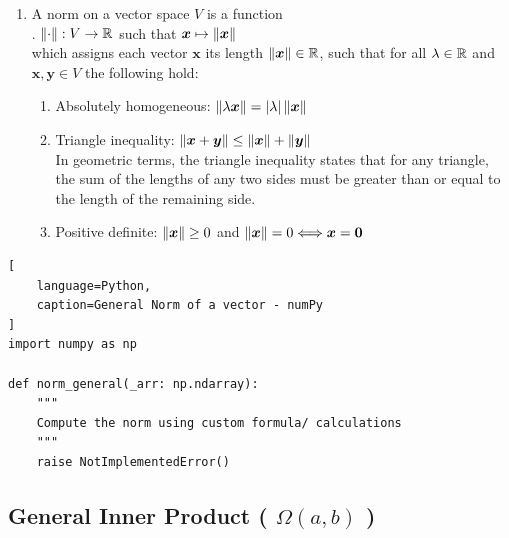 \begin{enumerate}
    \item 
    \begin{definition}[Norm]
        A norm on a vector space $V$ is a function
        \hfill \cite{mfml/book/mml/Deisenroth-Faisal-Ong}
        \\
        .\hfill
        $\left\| \cdot \right\|: V \to \mathbb{R}$ such that $\bm{x} \mapsto \left\| \bm{x} \right\|$
        \hfill \cite{mfml/book/mml/Deisenroth-Faisal-Ong}
        \\
        which assigns each vector $\bm{x}$ its length $\left\| \bm{x} \right\| \in \mathbb{R}$, such that for all $\lambda \in \mathbb{R}$ and $\bm{x}, \bm{y} \in V$ the following hold:
        \hfill \cite{mfml/book/mml/Deisenroth-Faisal-Ong}
    \end{definition}
    \begin{enumerate}
        \item Absolutely homogeneous: $\left\| \lambda \bm{x} \right\| = \left| \lambda \right| \left\| \bm{x} \right\|$
        \hfill \cite{mfml/book/mml/Deisenroth-Faisal-Ong}

        \item Triangle inequality: $\left\| \bm{x} + \bm{y} \right\| \leq \left\| \bm{x} \right\| + \left\| \bm{y} \right\|$
        \hfill \cite{mfml/book/mml/Deisenroth-Faisal-Ong}
        \\
        In geometric terms, the triangle inequality states that for any triangle, the sum of the lengths of any two sides must be greater than or equal to the length of the remaining side.
        \hfill \cite{mfml/book/mml/Deisenroth-Faisal-Ong}

        \item Positive definite: $\left\| \bm{x} \right\| \geq 0$ and $\left\| \bm{x} \right\| = 0 \Longleftrightarrow \bm{x} = \bm{0}$
        \hfill \cite{mfml/book/mml/Deisenroth-Faisal-Ong}
    \end{enumerate}
\end{enumerate}




\begin{lstlisting}[
    language=Python,
    caption=General Norm of a vector - numPy
]
import numpy as np

def norm_general(_arr: np.ndarray):
    """
    Compute the norm using custom formula/ calculations
    """
    raise NotImplementedError()
\end{lstlisting}






\subsection{General Inner Product ( $\Omega(a, b)$ )}

